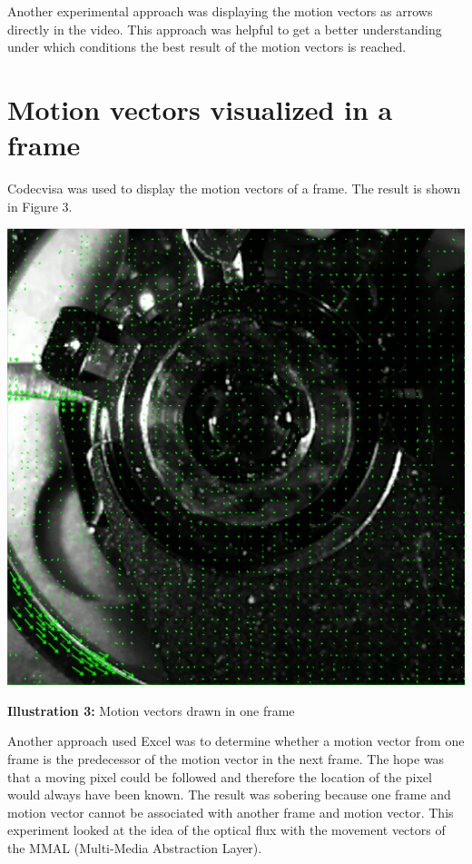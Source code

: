 \documentclass[12pt, a4paper]{report}
\begin{document}
\bigskip

Another experimental approach was displaying the motion vectors as arrows directly in the video. This approach was helpful to get a better understanding under which conditions the best result of the motion vectors is reached.
\pagebreak

\section{Motion vectors visualized in a frame}
Codecvisa was used to display the motion vectors of a frame.
The result is shown in Figure 3.
\bigskip
\noindent
\begin{center}
\includegraphics[scale=0.4]{Images/motion_vectors.png}

{\bf Illustration 3:}  Motion vectors drawn in one frame
\end{center}
\bigskip

Another approach used Excel was to determine whether a motion vector from one frame is the predecessor of the motion vector in the next frame.
The hope was that a moving pixel could be followed and therefore the location of the pixel would always have been known.
The result was sobering because one frame and motion vector cannot be associated with another frame and motion vector.
This experiment looked at the idea of the optical flux with the movement vectors of the MMAL (Multi-Media Abstraction Layer).
\end{document}
